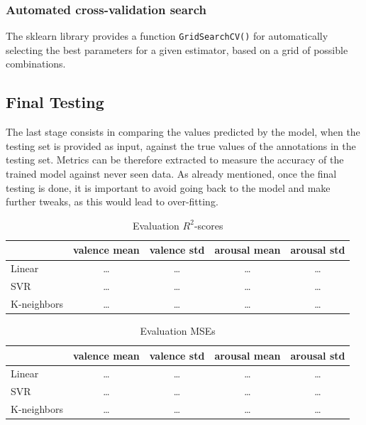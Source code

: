 \subsubsection{Automated cross-validation search}

The sklearn library provides a function \texttt{GridSearchCV()} for automatically selecting the best parameters for a given estimator, based on a grid of possible combinations.



\subsection{Final Testing}

The last stage consists in comparing the values predicted by the model, when the testing set is provided as input, against the true values of the annotations in the testing set. Metrics can be therefore extracted to measure the accuracy of the trained model against never seen data. As already mentioned, once the final testing is done, it is important to avoid going back to the model and make further tweaks, as this would lead to over-fitting.

\begin{table}
	\centering
	\begin{tabular}{lcccc}
		\toprule
		& valence mean & valence std & arousal mean & arousal std \\
		\midrule
		Linear & \dots & \dots & \dots & \dots \\
		SVR & \dots & \dots & \dots & \dots \\
		K-neighbors & \dots & \dots & \dots & \dots \\
		\bottomrule
	\end{tabular}
	\caption{Evaluation $R^2$-scores}
	\label{table:eval-r2}
\end{table}

\begin{table}
	\centering
	\begin{tabular}{lcccc}
		\toprule
		& valence mean & valence std & arousal mean & arousal std \\
		\midrule
		Linear & \dots & \dots & \dots & \dots \\
		SVR & \dots & \dots & \dots & \dots \\
		K-neighbors & \dots & \dots & \dots & \dots \\
		\bottomrule
	\end{tabular}
	\caption{Evaluation MSEs}
	\label{table:eval-mse}
\end{table}

